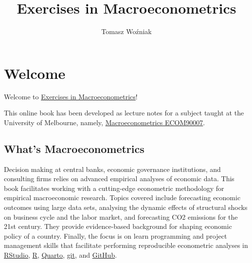 \documentclass[
  letterpaper,
  DIV=11,
  numbers=noendperiod]{scrreprt}
\title{Exercises in Macroeconometrics}
\author{Tomasz Woźniak}
\date{}
\renewcommand*\contentsname{Table of contents}
\newcommand\contentsname{Table of contents}
\begin{document}
\maketitle
\ifdefined\Shaded\renewenvironment{Shaded}{\begin{tcolorbox}[interior hidden, boxrule=0pt, borderline west={3pt}{0pt}{shadecolor}, enhanced, breakable, sharp corners, frame hidden]}{\end{tcolorbox}}\fi

\renewcommand*\contentsname{Table of contents}
{
\hypersetup{linkcolor=}
\setcounter{tocdepth}{2}
\tableofcontents
}

\hypertarget{welcome}{%
\chapter*{Welcome}\label{welcome}}

Welcome to
\href{https://donotdespair.github.io/exercises-in-macroeconometrics/}{Exercises
in Macroeconometrics}!

This online book has been developed as lecture notes for a subject
taught at the University of Melbourne, namely,
\href{https://handbook.unimelb.edu.au/2022/subjects/ecom90007}{Macroeconometrics
ECOM90007}.

\hypertarget{whats-macroeconometrics}{%
\section*{What's Macroeconometrics}\label{whats-macroeconometrics}}

Decision making at central banks, economic governance institutions, and
consulting firms relies on advanced empirical analyses of economic data.
This book facilitates working with a cutting-edge econometric
methodology for empirical macroeconomic research. Topics covered include
forecasting economic outcomes using large data sets, analysing the
dynamic effects of structural shocks on business cycle and the labor
market, and forecasting CO2 emissions for the 21st century. They provide
evidence-based background for shaping economic policy of a country.
Finally, the focus is on learn programming and project management skills
that facilitate performing reproducible econometric analyses in
\href{https://www.rstudio.com/}{RStudio},
\href{https://cran.r-project.org/}{R},
\href{https://quarto.org/}{Quarto}, \href{https://git-scm.com/}{git},
and \href{https://GitHub.com/}{GitHub}.
\end{document}
